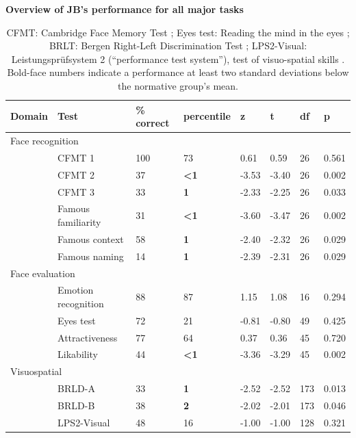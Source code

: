 \documentclass[fleqn,10pt]{SelfArx} %
\begin{document}
\begin{table}[htbp]
	\renewcommand{\familydefault}{\sfdefault}\normalfont\renewcommand{}
	\centering
	\caption{\bf Overview of JB's performance for all major tasks}
	\small
	\begin{tabular}{llllllll}
		\hline
			Domain & Test & \% correct & percentile & z & t & df & p \\
		\hline
		\multicolumn{2}{l}{Face recognition} \\
		& CFMT 1 &  100 &         73 &  0.61 &  0.59 &   26 &  0.561  \\
		& CFMT 2 &         37 &         \textbf{<1} & -3.53 & -3.40 &   26 &  0.002 \\
		& CFMT 3 &         33 &           \textbf{1} & -2.33 & -2.25 &   26 &  0.033  \\
		& Famous familiarity &         31 &          \textbf{<1} & -3.60 & -3.47 &   26 &  0.002 \\
		& Famous context &         58 &           \textbf{1} & -2.40 & -2.32 &   26 &  0.029 \\
		& Famous naming &         14 &           \textbf{1} & -2.39 & -2.31 &   26 &  0.029 \\
		\multicolumn{2}{l}{Face evaluation} \\
		& Emotion recognition &         88 &         87 &  1.15 &  1.08 &   16 &  0.294  \\
		& Eyes test &         72 &         21 & -0.81 & -0.80 &   49 &  0.425  \\
		& Attractiveness &         77 &         64 &  0.37 &  0.36 &   45 &  0.720 \\
		& Likability &         44 &          \textbf{<1} & -3.36 & -3.29 &   45 &  0.002 \\
		\multicolumn{2}{l}{Visuospatial} \\
		& BRLD-A &         33 &           \textbf{1} & -2.52 & -2.52 &  173 &  0.013 \\
		& BRLD-B &         38 &           \textbf{2} & -2.02 & -2.01 &  173 &  0.046 \\
		& LPS2-Visual &         48 &         16 & -1.00 & -1.00 &  128 &  0.321 \\
		\hline
	\end{tabular}
	\parbox{12cm}{\caption*{CFMT: Cambridge Face Memory Test \citep{Duchaine_2006cfmt}; Eyes test: Reading the mind in the eyes \citep{Baron_Cohen_2001}; BRLT: Bergen Right-Left Discrimination Test \citep{Ofte_2002}; LPS2-Visual: Leistungsprüfsystem 2 (“performance test system”), test of visuo-spatial skills \citep{Horn}. Bold-face numbers indicate a performance at least two standard deviations below the normative group's mean.} }
	\label{tab:summary}
\end{table}
\end{document}
